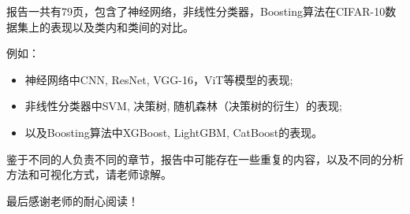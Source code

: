 \documentclass[UTF8]{report}
\theoremstyle{MyLineTheoremStyle} %
\theoremstyle{MyBlockTheoremStyle} %
\theoremstyle{MySubsubsectionStyle} %
\begin{document}
报告一共有79页，包含了神经网络，非线性分类器，Boosting算法在CIFAR-10数据集上的表现以及类内和类间的对比。

例如：
\begin{itemize}
    \item 神经网络中CNN, ResNet, VGG-16，ViT等模型的表现;
    \item 非线性分类器中SVM, 决策树, 随机森林（决策树的衍生）的表现;
    \item 以及Boosting算法中XGBoost, LightGBM, CatBoost的表现。
\end{itemize}

鉴于不同的人负责不同的章节，报告中可能存在一些重复的内容，以及不同的分析方法和可视化方式，请老师谅解。

最后感谢老师的耐心阅读！
\end{document}
